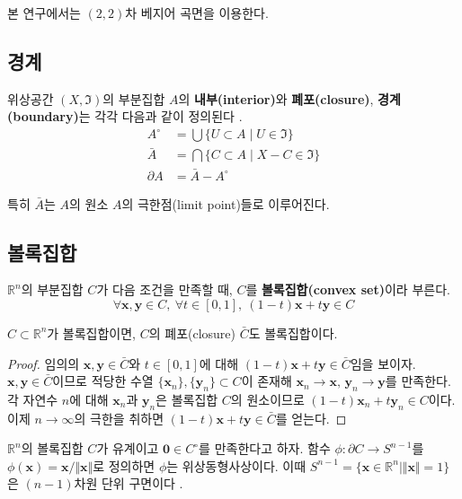 \documentclass{Humantech_Paper_Awardfullpaper_hutech}
\begin{document}
본 연구에서는 $(2, 2)$차 베지어 곡면을 이용한다. 

\subsection{경계}
\begin{defn}
	위상공간 $(X, \mathfrak{I})$의 부분집합 $A$의 \textbf{내부(interior)}와 \textbf{폐포(closure)}, \textbf{경계(boundary)}는 각각 다음과 같이 정의된다 \cite{Munkres}.
	\begin{align*}
		A^\circ &= \bigcup \{ U \subset A \mid U \in \mathfrak{I} \} \\
		\bar{A} &= \bigcap \{ C \subset A \mid X-C \in \mathfrak{I} \} \\
		\partial A &= \bar{A} - A^\circ
	\end{align*}
\end{defn}

특히 $\bar{A}$는 $A$의 원소 $A$의 극한점(limit point)들로 이루어진다. 

\subsection{볼록집합}
\begin{defn}
	$\mathbb{R}^n$의 부분집합 $C$가 다음 조건을 만족할 때, $C$를 \textbf{볼록집합(convex set)}이라 부른다. 
	\begin{equation*}
		\forall \mathbf{x}, \mathbf{y} \in C,\ \forall t \in [0, 1],\ (1-t)\mathbf{x}+t\mathbf{y} \in C
	\end{equation*}
\end{defn}

\begin{lem} \label{closureofconvexset}
	$C \subset \mathbb{R}^n$가 볼록집합이면, $C$의 폐포(closure) $\bar{C}$도 볼록집합이다. 
\end{lem}
\begin{proof}
	임의의 $\mathbf{x}, \mathbf{y} \in \bar{C}$와 $t \in [0, 1]$에 대해 $(1-t)\mathbf{x} + t\mathbf{y} \in \bar{C}$임을 보이자. $\mathbf{x}, \mathbf{y} \in \bar{C}$이므로 적당한 수열 $\{ \mathbf{x}_n \}, \{ \mathbf{y}_n \} \subset C$이 존재해 $\mathbf{x}_n \to \mathbf{x}, \, \mathbf{y}_n \to \mathbf{y}$를 만족한다. 각 자연수 $n$에 대해 $\mathbf{x}_n$과 $\mathbf{y}_n$은 볼록집합 $C$의 원소이므로 $(1-t)\mathbf{x}_n + t\mathbf{y}_n \in C$이다. 이제 $n \to \infty$의 극한을 취하면 $(1-t)\mathbf{x} + t\mathbf{y} \in \bar{C}$를 얻는다. 
\end{proof}

\begin{thm} \label{homeo}
	$\mathbb{R}^n$의 볼록집합 $C$가 유계이고 $\mathbf{0} \in C^\circ$를 만족한다고 하자. 함수 $\phi \colon \partial C \to S^{n-1}$를 $\phi(\mathbf{x}) = \mathbf{x} / \Vert \mathbf{x} \Vert$로 정의하면 $\phi$는 위상동형사상이다. 이때 $S^{n-1} = \{ \mathbf{x} \in \mathbb{R}^n \mid \Vert \mathbf{x} \Vert = 1 \}$은 $(n-1)$차원 단위 구면이다 \cite{convex}.
\end{thm}
\end{document}

